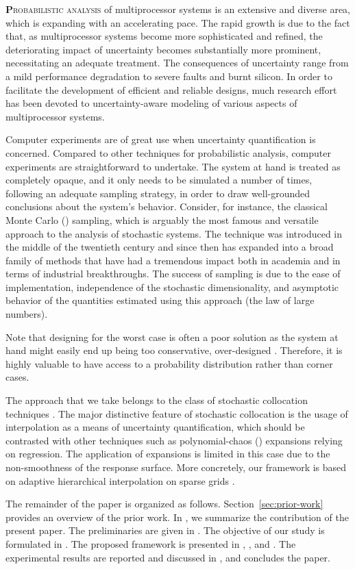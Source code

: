 \lettrine[findent=0.4em, nindent=0em]{\textbf{P}}{robabilistic analysis} of
multiprocessor systems is an extensive and diverse area, which is expanding with
an accelerating pace. The rapid growth is due to the fact that, as
multiprocessor systems become more sophisticated and refined, the deteriorating
impact of uncertainty becomes substantially more prominent, necessitating an
adequate treatment. The consequences of uncertainty range from a mild
performance degradation to severe faults and burnt silicon. In order to
facilitate the development of efficient and reliable designs, much research
effort has been devoted to uncertainty-aware modeling of various aspects of
multiprocessor systems.

Computer experiments \cite{santner2003} are of great use when uncertainty
quantification is concerned. Compared to other techniques for probabilistic
analysis, computer experiments are straightforward to undertake. The system at
hand is treated as completely opaque, and it only needs to be simulated a number
of times, following an adequate sampling strategy, in order to draw
well-grounded conclusions about the system's behavior. Consider, for instance,
the classical Monte Carlo () sampling, which is arguably the most
famous and versatile approach to the analysis of stochastic systems. The
technique was introduced in the middle of the twentieth century and since then
has expanded into a broad family of methods that have had a tremendous impact
both in academia and in terms of industrial breakthroughs. The success of
 sampling is due to the ease of implementation, independence of the
stochastic dimensionality, and asymptotic behavior of the quantities estimated
using this approach (the law of large numbers).

Note that designing for the worst case is often a poor solution as the system at
hand might easily end up being too conservative, over-designed
\cite{quinton2012}. Therefore, it is highly valuable to have access to a
probability distribution rather than corner cases.

The approach that we take belongs to the class of stochastic collocation
techniques \cite{xiu2010}. The major distinctive feature of stochastic
collocation is the usage of interpolation as a means of uncertainty
quantification, which should be contrasted with other techniques such as
polynomial-chaos () expansions relying on regression. The application
of  expansions is limited in this case due to the non-smoothness of the
response surface. More concretely, our framework is based on adaptive
hierarchical interpolation on sparse grids \cite{klimke2006, ma2009}.

The remainder of the paper is organized as follows. Section~\ref{sec:prior-work}
provides an overview of the prior work. In , we summarize the
contribution of the present paper. The preliminaries are given in
. The objective of our study is formulated in
. The proposed framework is presented in
, , and . The experimental
results are reported and discussed in , and
 concludes the paper.

